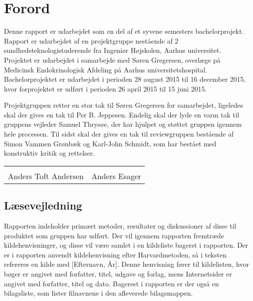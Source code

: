 \chapter*{Forord}

Denne rapport er udarbejdet som en del af et syvene semesters bachelorprojekt. Rapport er udarbejdet af en projektgruppe nestående af 2 sundhedsteknologistuderende fra Ingeniør Højskolen, Aarhus universitet. Projektet er udarbejdet i samarbejde med Søren Gregersen, overlæge på Medicinsk Endokrinologisk Afdeling på Aarhus universitetshospital. Bachelorprojektet er udarbejdet i perioden 28 august 2015 til 16 december 2015, hvor forprojektet er udført i perioden 26 april 2015 til 15 juni 2015.  

Projektgruppen retter en stor tak til Søren Gregersen for samarbejdet, ligeledes skal der gives en tak til Per B. Jeppesen. Endelig skal der lyde en varm tak til gruppens vejleder Samuel Thrysøe, der har hjulpet og støttet gruppen igennem hele processen. Til sidst skal der gives en tak til reviewgruppen bestående af Simon Vammen Grønbæk og Karl-John Schmidt, som har bestået med konstruktiv kritik og rettelser. 






\phantom{Luft}

\phantom{Luft}

\begin{table}[H]
	\centering
		\begin{tabular}{c c}
			\underline{\phantom{mmmmmmmmmmmmmm}} & \underline{\phantom{mmmmmmmmmmmmmm}}  \\
			Anders Toft Andersen			& Anders Esager		 			\\ 										\end{tabular}
\end{table}

\section*{Læsevejledning}
Rapporten indeholder primært metoder, resultater og diskussioner af disse til produktet som gruppen har udført. Der vil igennem rapporten fremtræde kildehenvisninger, og disse vil være samlet i en kildeliste bagerst i rapporten. Der er i rapporten anvendt kildehenvisning efter Harvardmetoden, så i teksten refereres en kilde med [Efternavn, År]. Denne henvisning fører til kildelisten, hvor bøger er angivet med forfatter, titel, udgave og forlag, mens Internetsider er angivet med forfatter, titel og dato. Bagerest i rapporten er der også en bilagsliste, som lister filnavnene i den afleverede bilagsmappen.

